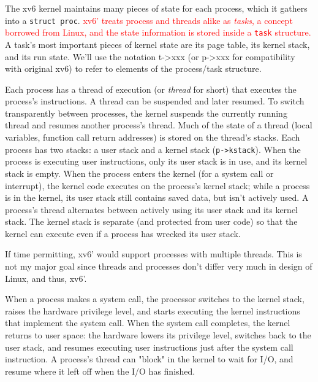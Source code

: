\documentclass{report}
\newenvironment{hilight}{\color{red}}{\color{black}}
\begin{document}
	The xv6 kernel maintains many pieces of state for each process, which it gathers
	into a \texttt{struct proc}. \textcolor{red}{
		xv6' treats process and threads alike as \emph{tasks}, a concept borrowed from
		Linux, and the state information is stored inside a
		\texttt{task}
		structure.
	} A task's most important pieces of kernel state are its
	page table, its kernel stack, and its run state. We'll use the notation t->xxx 
	(or p->xxx for compatibility with original xv6) to refer to
	elements of the process/task structure.
	
	Each process has a thread of execution (or \emph{thread} for short) that executes the
	process's instructions. A thread can be suspended and later resumed. To switch
	transparently between processes, the kernel suspends the currently running thread and
	resumes another process's thread. Much of the state of a thread (local variables, function
	call return addresses) is stored on the thread's stacks. Each process has two stacks: a
	user stack and a kernel stack (\texttt{p->kstack}). When the process is executing user
	instructions, only its user stack is in use, and its kernel stack is empty. When the
	process enters the kernel (for a system call or interrupt), the kernel code executes on the
	process's kernel stack; while a process is in the kernel, its user stack still contains saved
	data, but isn't actively used. A process's thread alternates between actively using its
	user stack and its kernel stack. The kernel stack is separate (and protected from user
	code) so that the kernel can execute even if a process has wrecked its user stack.
	
	\begin{hilight}
		If time permitting, xv6' would support processes with multiple threads.  This is not
		my major goal since threads and processes don't differ very much in design of Linux, and thus,
		xv6'.
	\end{hilight}
	
	When a process makes a system call, the processor switches to the kernel stack,
	raises the hardware privilege level, and starts executing the kernel instructions that 
	implement the system call. When the system call completes, the kernel returns to user
	space: the hardware lowers its privilege level, switches back to the user stack, and 
	resumes executing user instructions just after the system call instruction. A process's
	thread can "block" in the kernel to wait for I/O, and resume where it left off when the
	I/O has finished.
	
\end{document}
